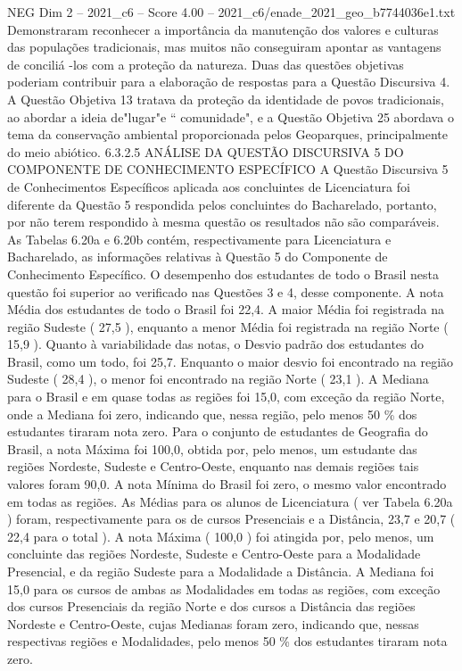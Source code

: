 \begin{textsample}{NEG Dim 2 – 2021\_c6 – Score 4.00 – 2021\_c6/enade\_2021\_geo\_b7744036e1.txt}
Demonstraram reconhecer a importância da manutenção dos valores e culturas das populações tradicionais, mas muitos não conseguiram apontar as vantagens de conciliá -los com a proteção da natureza.
Duas das questões objetivas poderiam contribuir para a elaboração de respostas para a Questão Discursiva 4.
A Questão Objetiva 13 tratava da proteção da identidade de povos tradicionais, ao abordar a ideia de"lugar"e “ comunidade", e a Questão Objetiva 25 abordava o tema da conservação ambiental proporcionada pelos Geoparques, principalmente do meio abiótico. 6.3.2.5 ANÁLISE DA QUESTÃO DISCURSIVA 5 DO COMPONENTE DE CONHECIMENTO ESPECÍFICO A Questão Discursiva 5 de Conhecimentos Específicos aplicada aos concluintes de Licenciatura foi diferente da Questão 5 respondida pelos concluintes do Bacharelado, portanto, por não terem respondido à mesma questão os resultados não são comparáveis.
As Tabelas 6.20a e 6.20b contém, respectivamente para Licenciatura e Bacharelado, as informações relativas à Questão 5 do Componente de Conhecimento Específico.
O desempenho dos estudantes de todo o Brasil nesta questão foi superior ao verificado nas Questões 3 e 4, desse componente.
A nota Média dos estudantes de todo o Brasil foi 22,4.
A maior Média foi registrada na região Sudeste ( 27,5 ), enquanto a menor Média foi registrada na região Norte ( 15,9 ).
Quanto à variabilidade das notas, o Desvio padrão dos estudantes do Brasil, como um todo, foi 25,7.
Enquanto o maior desvio foi encontrado na região Sudeste ( 28,4 ), o menor foi encontrado na região Norte ( 23,1 ).
A Mediana para o Brasil e em quase todas as regiões foi 15,0, com exceção da região Norte, onde a Mediana foi zero, indicando que, nessa região, pelo menos 50 \% dos estudantes tiraram nota zero.
Para o conjunto de estudantes de Geografia do Brasil, a nota Máxima foi 100,0, obtida por, pelo menos, um estudante das regiões Nordeste, Sudeste e Centro-Oeste, enquanto nas demais regiões tais valores foram 90,0.
A nota Mínima do Brasil foi zero, o mesmo valor encontrado em todas as regiões.
As Médias para os alunos de Licenciatura ( ver Tabela 6.20a ) foram, respectivamente para os de cursos Presenciais e a Distância, 23,7 e 20,7 ( 22,4 para o total ).
A nota Máxima ( 100,0 ) foi atingida por, pelo menos, um concluinte das regiões Nordeste, Sudeste e Centro-Oeste para a Modalidade Presencial, e da região Sudeste para a Modalidade a Distância.
A Mediana foi 15,0 para os cursos de ambas as Modalidades em todas as regiões, com exceção dos cursos Presenciais da região Norte e dos cursos a Distância das regiões Nordeste e Centro-Oeste, cujas Medianas foram zero, indicando que, nessas respectivas regiões e Modalidades, pelo menos 50 \% dos estudantes tiraram nota zero.

\end{textsample}
